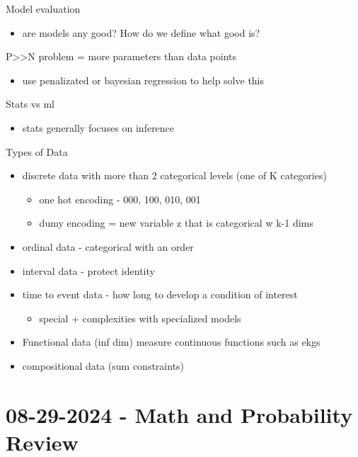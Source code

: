 \documentclass[a4paper]{article}
\begin{document}
Model evaluation
\begin{itemize}
\item are models any good? How do we define what good is?
\end{itemize}
P>>N problem = more parameters than data points
\begin{itemize}
\item use penalizated or bayesian regression to help solve this
\end{itemize}
Stats vs ml
\begin{itemize}
\item stats generally focuses on inference
\end{itemize}
Types of Data
\begin{itemize}
\item discrete data with more than 2 categorical levels (one of K categories)
\begin{itemize}
\item one hot encoding - 000, 100, 010, 001
\item dumy encoding = new variable z that is categorical w k-1 dims
\end{itemize}
\item ordinal data - categorical with an order
\item interval data - protect identity
\item time to event data - how long to develop a condition of interest
\begin{itemize}
\item special + complexities with specialized models
\end{itemize}
\item Functional data (inf dim) measure continuous functions such as ekgs
\item compositional data (sum constraints)
\end{itemize}
\section{08-29-2024 - Math and Probability Review}
\label{sec:org0a760d7}
\end{document}

